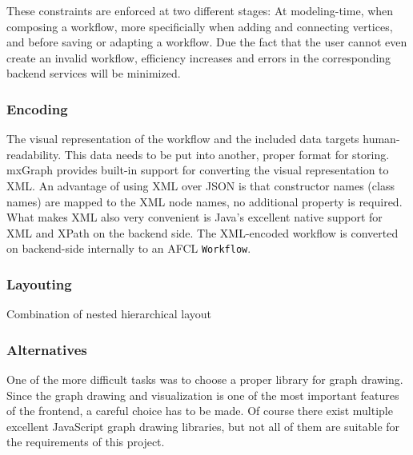 \documentclass[a4paper,12pt,pdftex,halfparskip,cleardoubleempty,bibtotoc,liststotoc]{scrbook}
\begin{document}
These constraints are enforced at two different stages: At modeling-time, when composing a workflow, more specificially when adding and connecting vertices, and before saving or adapting a workflow.
Due the fact that the user cannot even create an invalid workflow, efficiency increases and errors in the corresponding backend services will be minimized.


\subsubsection{Encoding}

The visual representation of the workflow and the included data targets human-readability. This data needs to be put into another, proper format for storing. mxGraph provides built-in support for converting the visual representation to XML. An advantage of using XML over JSON is that constructor names (class names) are mapped to the XML node names, no additional property is required.
What makes XML also very convenient is Java's excellent native support for XML and XPath on the backend side. The XML-encoded workflow is converted on backend-side internally to an AFCL \texttt{Workflow}.


\subsubsection{Layouting}

Combination of nested hierarchical layout

\label{sec:graph-alternatives}
\subsubsection{Alternatives}

One of the more difficult tasks was to choose a proper library for graph drawing. Since the graph drawing and visualization is one of the most important features of the frontend, a careful choice has to be made. Of course there exist multiple excellent JavaScript graph drawing libraries, but not all of them are suitable for the requirements of this project.
\end{document}
